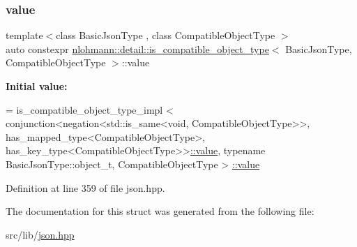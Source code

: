 \subsubsection{\texorpdfstring{value}{value}}
{\footnotesize\ttfamily template$<$class Basic\+Json\+Type , class Compatible\+Object\+Type $>$ \\
auto constexpr \hyperlink{structnlohmann_1_1detail_1_1is__compatible__object__type}{nlohmann\+::detail\+::is\+\_\+compatible\+\_\+object\+\_\+type}$<$ Basic\+Json\+Type, Compatible\+Object\+Type $>$\+::value\hspace{0.3cm}{\ttfamily [static]}}

{\bfseries Initial value\+:}
\begin{DoxyCode}
= is\_compatible\_object\_type\_impl <
                                  conjunction<negation<std::is\_same<void, CompatibleObjectType>>,
                                  has\_mapped\_type<CompatibleObjectType>,
                                  has\_key\_type<CompatibleObjectType>>\hyperlink{structnlohmann_1_1detail_1_1is__compatible__object__type_a87cce7bcdcd22cc8517f171705f6a7c7}{::value},
                                  \textcolor{keyword}{typename} BasicJsonType::object\_t, CompatibleObjectType >
      \hyperlink{structnlohmann_1_1detail_1_1is__compatible__object__type_a87cce7bcdcd22cc8517f171705f6a7c7}{::value}
\end{DoxyCode}


Definition at line 359 of file json.\+hpp.



The documentation for this struct was generated from the following file\+:\begin{DoxyCompactItemize}
\item 
src/lib/\hyperlink{json_8hpp}{json.\+hpp}\end{DoxyCompactItemize}

